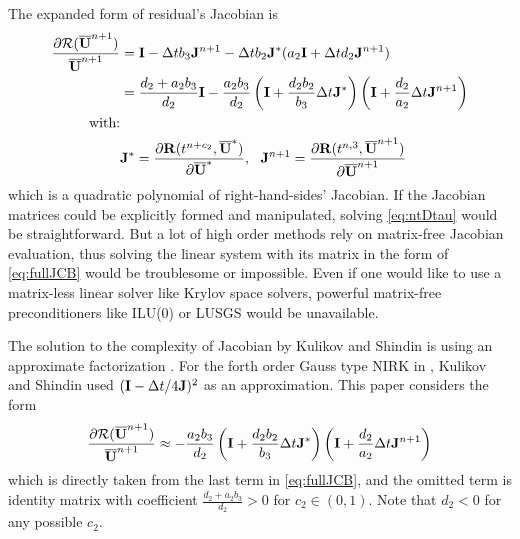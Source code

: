 \documentclass[preprint,12pt]{elsarticle}
\begin{document}
The expanded form of residual's Jacobian
is
\begin{equation}
    \label{eq:fullJCB}
    \begin{aligned}
        \frac{\partial \mathcal{R}(\overline{\mathbf{U}}^{n+1})}
        {\overline{\mathbf{U}}^{n+1}}
                     & = \mathbf{I} - \mathrm\Delta t b_3 \mathbf{J}^{n+1} -
        \mathrm\Delta t b_2\mathbf{J}^*(a_2\mathbf{I} +\mathrm\Delta t d_2 \mathbf{J}^{n+1})                                  \\
                     & = \frac{d_2 + a_2b_3}{d_2}\mathbf{I}
        -\frac{a_2b_3}{d_2}\left(
        \mathbf{I} + \frac{d_2b_2}{b_3}\mathrm\Delta t\mathbf{J}^*
        \right)\left(
        \mathbf{I} + \frac{d_2}{a_2}\mathrm\Delta t\mathbf{J}^{n+1}
        \right)                                                                       \\
        \text{with:} &                                                                \\
                     & \mathbf{J}^* = \frac{\partial \mathbf{R}(t^{n+c_2},\overline{\mathbf{U}}^*)}{\partial \overline{\mathbf{U}}^*},\ \
        \mathbf{J}^{n+1} = \frac{\partial \mathbf{R}(t^{n,3},\overline{\mathbf{U}}^{n+1})}{\partial \overline{\mathbf{U}}^{n+1}}
    \end{aligned}
\end{equation}
which is a quadratic polynomial of right-hand-sides'
Jacobian.
If the Jacobian matrices could be explicitly formed and
manipulated, solving \eqref{eq:ntDtau} would be straightforward.
But a lot of high order methods rely on matrix-free
Jacobian evaluation, thus solving the linear system
with its matrix in the form of \eqref{eq:fullJCB}
would be troublesome or impossible.
Even if one would like to use a matrix-less linear solver
like Krylov space solvers,
powerful matrix-free preconditioners like ILU(0) or
LUSGS would be unavailable.

The solution to the complexity of Jacobian
by Kulikov and Shindin
is using an approximate factorization
\cite{kulikov2006familyNIRKOrig,kulikov2009adaptive}.
For the forth order
Gauss type NIRK in \cite{kulikov2006familyNIRKOrig},
Kulikov and Shindin used $(\mathbf{I}-\mathrm\Delta t /4 \mathbf{J})^2$
as an approximation.
This paper considers the form
\begin{equation}
    \label{eq:factJCB}
    \begin{aligned}
        \frac{\partial \mathcal{R}(\overline{\mathbf{U}}^{n+1})}
        {\overline{\mathbf{U}}^{n+1}}
         & \approx
        -\frac{a_2b_3}{d_2}\left(
        \mathbf{I} + \frac{d_2b_2}{b_3}\mathrm\Delta t\mathbf{J}^*
        \right)\left(
        \mathbf{I} + \frac{d_2}{a_2}\mathrm\Delta t\mathbf{J}^{n+1}
        \right)    \\
    \end{aligned}
\end{equation}
which is directly taken from the last term
in \eqref{eq:fullJCB}, and the omitted term
is identity matrix with coefficient $\frac{d_2 + a_2b_3}{d_2}>0$
for $c_2\in(0,1)$. Note that $d_2<0$ for any possible $c_2$.
\end{document}
